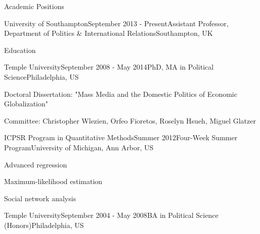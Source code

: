 \documentclass{resume} %
\begin{document}


\begin{rSection}{Academic Positions}

\begin{rSubsection}{University of Southampton}{September 2013 - Present}{Assistant Professor, Department of Politics \& International Relations}{Southampton, UK}
\item
\end{rSubsection}
\end{rSection}



\begin{rSection}{Education}

\begin{rSubsection}{Temple University}{September 2008 - May 2014}{PhD, MA in Political Science}{Philadelphia, US}
\item Doctoral Dissertation: "Mass Media and the Domestic Politics of Economic Globalization"
\item Committee: Christopher Wlezien, Orfeo Fioretos, Roselyn Hsueh, Miguel Glatzer
\end{rSubsection}

\begin{rSubsection}{ICPSR Program in Quantitative Methods}{Summer 2012}{Four-Week Summer Program}{University of Michigan, Ann Arbor, US}
\item Advanced regression
\item Maximum-likelihood estimation
\item Social network analysis
\end{rSubsection}

\begin{rSubsection}{Temple University}{September 2004 - May 2008}{BA in Political Science (Honors)}{Philadelphia, US}
\item 
\end{rSubsection}

\end{rSection}
\end{document}
